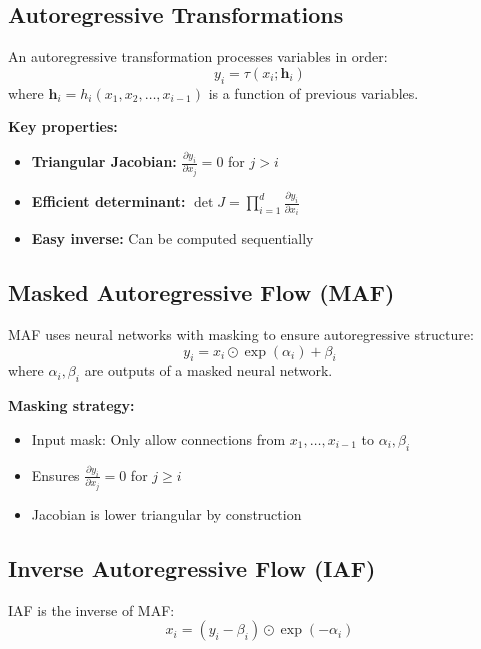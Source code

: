\subsection{Autoregressive Transformations}

An autoregressive transformation processes variables in order:
\begin{equation}
    y_i = \tau(x_i; \mathbf{h}_i)
\end{equation}
where $\mathbf{h}_i = h_i(x_1, x_2, \ldots, x_{i-1})$ is a function of previous variables.

\textbf{Key properties:}
\begin{itemize}
    \item \textbf{Triangular Jacobian:} $\frac{\partial y_i}{\partial x_j} = 0$ for $j > i$
    \item \textbf{Efficient determinant:} $\det J = \prod_{i=1}^d \frac{\partial y_i}{\partial x_i}$
    \item \textbf{Easy inverse:} Can be computed sequentially
\end{itemize}

\subsection{Masked Autoregressive Flow (MAF)}

MAF uses neural networks with masking to ensure autoregressive structure:
\begin{equation}
    y_i = x_i \odot \exp(\alpha_i) + \beta_i
\end{equation}
where $\alpha_i, \beta_i$ are outputs of a masked neural network.

\textbf{Masking strategy:}
\begin{itemize}
    \item Input mask: Only allow connections from $x_1, \ldots, x_{i-1}$ to $\alpha_i, \beta_i$
    \item Ensures $\frac{\partial y_i}{\partial x_j} = 0$ for $j \geq i$
    \item Jacobian is lower triangular by construction
\end{itemize}

\subsection{Inverse Autoregressive Flow (IAF)}

IAF is the inverse of MAF:
\begin{equation}
    x_i = (y_i - \beta_i) \odot \exp(-\alpha_i)
\end{equation}

